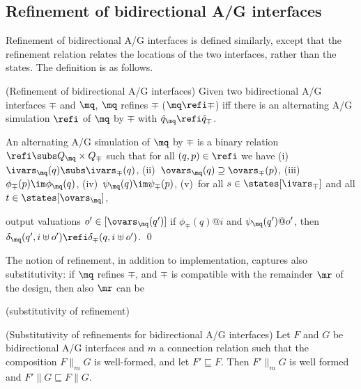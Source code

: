 \subsection{Refinement of bidirectional A/G interfaces}

Refinement of bidirectional A/G interfaces is defined similarly,
except that the refinement relation relates the locations of the two
interfaces, rather than the states. 
The definition is as follows. 

\begin{defi}{(Refinement of bidirectional A/G interfaces)}
Given two bidirectional A/G interfaces $\mp$ and $\mq$, $\mq$ refines
$\mp$ ($\mq \refi \mp$) iff there is an alternating A/G simulation
$\refi$ of $\mq$ by $\mp$ with $\hat{q}_{\mq} \refi
\hat{q}_\mp$. 

An alternating A/G simulation of $\mq$ by $\mp$ is a
binary relation $\refi \subs Q_{\mq} \times Q_\mp$ 
such that for all $(q,p) \in \refi$ we have 
(i)~$\ivars_\mq(q) \subs \ivars_\mp(q)$, 
(ii)~$\ovars_{\mq}(q) \supseteq \ovars_\mp(p)$, 
(iii)~$\phi_{\mp}(p) \im \phi_\mq(q)$, 
(iv)~$\psi_\mq(q) \im \psi_\mp(p)$, 
(v)~for all $s \in \states[\ivars_\mp]$ 
and all $t \in \states[\ovars_\mq]$, 

output valuations $o' \in [\ovars_{\mq}(q')]$ if
$\phi_\mp(q) @ i$ and $\psi_{\mq}(q') @ o'$, then $\delta_{\mq}(q',i
\uplus o') \refi \delta_\mp(q,i \uplus o')$.  \qed
\end{defi}

The notion of refinement, in addition to implementation, captures also
substitutivity: if $\mq$ refines $\mp$, and $\mp$ is compatible with
the remainder $\mr$ of the design, then also $\mr$ can be 

\begin{theo}{(substitutivity of refinement)}
\end{theo}

\begin{theo}{(Substitutivity of refinements for bidirectional A/G interfaces)}
Let $F$ and $G$ be bidirectional A/G interfaces and $m$ a connection relation 
such that the composition $F \parallel_m G$ is well-formed, and let 
$F' \sqsubseteq F$. Then $F' \parallel_m G$ is well formed and 
$F' \parallel G \sqsubseteq F \parallel G$.
\end{theo}

